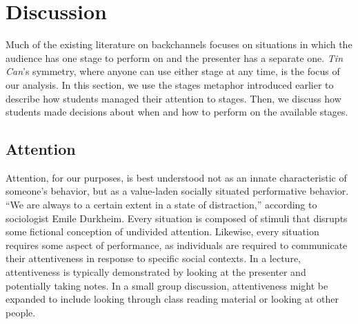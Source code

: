 




\section{Discussion}
Much of the existing literature on backchannels focuses on situations in which the audience has one stage to perform on and the presenter has a separate one.  \citep{Yardi:2006uk, mccarthy_digital_2004} \emph{Tin Can}'s symmetry, where anyone can use either stage at any time, is the focus of our analysis. In this section, we use the stages metaphor introduced earlier to describe how students managed their attention to stages. Then, we discuss how students made decisions about when and how to perform on the available stages. 

\subsection{Attention}
Attention, for our purposes, is best understood not as an innate characteristic of someone's behavior, but as a value-laden socially situated performative behavior. ``We are always to a certain extent in a state of distraction,'' according to sociologist Emile Durkheim. \citep{Durkheim:1974tc} Every situation is composed of stimuli that disrupts some fictional conception of undivided attention.  Likewise, every situation requires some aspect of performance, as individuals are required to communicate their attentiveness in response to specific social contexts. In a lecture, attentiveness is typically demonstrated by looking at the presenter and potentially taking notes. In a small group discussion, attentiveness might be expanded to include looking through class reading material or looking at other people. 

